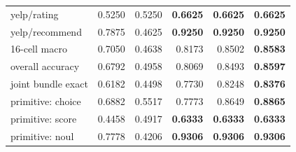 \begin{table}[t]
\begin{tabular}{lrrrrr}
yelp/rating & 0.5250 & 0.5250 & \textbf{0.6625} & \textbf{0.6625} & \textbf{0.6625} \\
yelp/recommend & 0.7875 & 0.4625 & \textbf{0.9250} & \textbf{0.9250} & \textbf{0.9250} \\
\midrule
16-cell macro & 0.7050 & 0.4638 & 0.8173 & 0.8502 & \textbf{0.8583} \\
overall accuracy & 0.6792 & 0.4958 & 0.8069 & 0.8493 & \textbf{0.8597} \\
joint bundle exact & 0.6182 & 0.4498 & 0.7730 & 0.8248 & \textbf{0.8376} \\
\midrule
primitive: choice & 0.6882 & 0.5517 & 0.7773 & 0.8649 & \textbf{0.8865} \\
primitive: score & 0.4458 & 0.4917 & \textbf{0.6333} & \textbf{0.6333} & \textbf{0.6333} \\
primitive: noul & 0.7778 & 0.4206 & \textbf{0.9306} & \textbf{0.9306} & \textbf{0.9306} \\
\bottomrule
\end{tabular}
\end{table}
